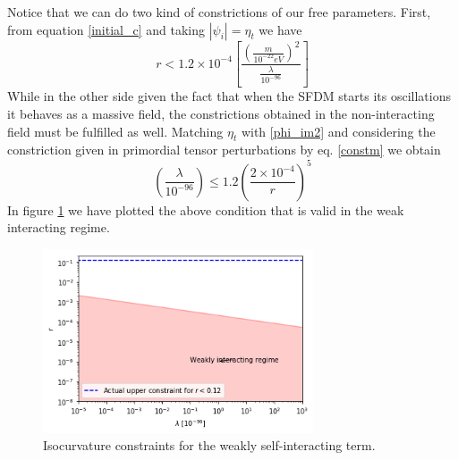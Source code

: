 \documentclass[amssymb,twocolumn,prd,nofootinbib,showpacs]{revtex4-1}
\begin{document}
Notice that we can do two kind of constrictions of our free parameters. First, from equation \eqref{initial_c} and taking $|\psi_i|=\eta_t$ we have
\begin{equation}
r<1.2\times 10^{-4}\left[\frac{\left(\frac{m}{10^{-22}eV}\right)^2}{\frac{\lambda}{10^{-96}}}\right]
\end{equation}
While in the other side given the fact that when the SFDM starts its oscillations it behaves as a massive field, the constrictions obtained in the non-interacting field must be fulfilled as well. Matching $\eta_t$ with \eqref{phi_im2} and considering the constriction given in primordial tensor perturbations by eq. \eqref{constm} we obtain
\begin{equation}
\left(\frac{\lambda}{10^{-96}}\right)\leq 1.2\left(\frac{2\times 10^{-4}}{r}\right)^5
\end{equation}
In figure \ref{constraintsSFDMl} we have plotted the above condition that is valid in the weak interacting regime.

\begin{figure}[h]
\includegraphics[width=8cm]{lambdavsr.png}
\caption{Isocurvature constraints for the weakly self-interacting term.}\label{constraintsSFDMl}
\end{figure} 
\end{document}
